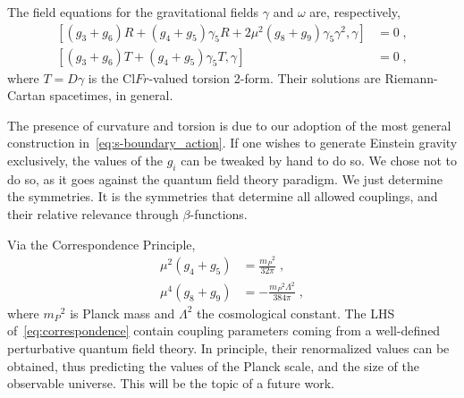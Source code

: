 \documentclass[../main.tex]{subfiles}
\begin{document}
The field equations for the gravitational fields $\gamma$ and $\omega$ are, respectively,
\begin{subequations}%
  \label{eq:grav_field_eqs}
  \begin{align}
    \left[ \left( g_3 + g_6 \right) R + \left( g_4 + g_5 \right) \gamma_5 R + 2 \mu^2 \left( g_8 + g_9 \right) \gamma_5\gamma^2 , \gamma \right] & = 0 \;, \\
    \left[ \left( g_3 + g_6 \right) T + \left( g_4 + g_5 \right) \gamma_5 T, \gamma \right]                                                      & = 0 \;,
  \end{align}
\end{subequations}
where $ T = D \gamma $ is the $\mathrm{Cl}Fr$-valued torsion 2-form. Their solutions are Riemann-Cartan spacetimes, in general.

The presence of curvature and torsion is due to our adoption of the most general construction in~\eqref{eq:s-boundary_action}. If one wishes to generate Einstein gravity exclusively, the values of the $ g_i $ can be tweaked by hand to do so. We chose not to do so, as it goes against the quantum field theory paradigm. We just determine the symmetries. It is the symmetries that determine all allowed couplings, and their relative relevance through $ \beta $-functions.

Via the Correspondence Principle,
\begin{subequations}%
  \label{eq:correspondence}
  \begin{align}
    \mu^2 \left( g_4+g_5 \right) & = \frac{{m_P}^2}{32\pi} \;,            \\
    \mu^4 \left( g_8+g_9 \right) & = -\frac{{m_P}^2\Lambda^2}{384\pi} \;,
  \end{align}
\end{subequations}
where ${m_P}^2$ is Planck mass and $\Lambda^2$ the cosmological constant. The LHS of~\eqref{eq:correspondence} contain coupling parameters coming from a well-defined perturbative quantum field theory. In principle, their renormalized values can be obtained, thus predicting the values of the Planck scale, and the size of the observable universe. This will be the topic of a future work.
\end{document}
